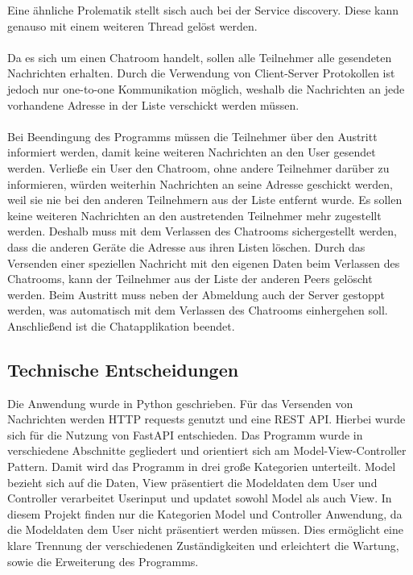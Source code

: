 Eine ähnliche Prolematik stellt sisch auch bei der Service discovery. Diese kann genauso mit einem weiteren Thread gelöst werden. 
\\
\\
Da es sich um einen Chatroom handelt, sollen alle Teilnehmer alle gesendeten Nachrichten erhalten.
Durch die Verwendung von Client-Server Protokollen ist jedoch nur one-to-one Kommunikation möglich, weshalb die Nachrichten an jede vorhandene Adresse in der Liste verschickt werden müssen\cite[S. 214]{steen23}.
\\
\\
Bei Beendingung des Programms müssen die Teilnehmer über den Austritt informiert werden, damit keine weiteren Nachrichten an den User gesendet werden.
Verließe ein User den Chatroom, ohne andere Teilnehmer darüber zu informieren, würden weiterhin Nachrichten an seine Adresse geschickt werden, weil sie nie bei den anderen Teilnehmern aus der Liste entfernt wurde.
Es sollen keine weiteren Nachrichten an den austretenden Teilnehmer mehr zugestellt werden.
Deshalb muss mit dem Verlassen des Chatrooms sichergestellt werden, dass die anderen Geräte die Adresse aus ihren Listen löschen.
Durch das Versenden einer speziellen Nachricht mit den eigenen Daten beim Verlassen des Chatrooms, kann der Teilnehmer aus der Liste der anderen Peers gelöscht werden. 
Beim Austritt muss neben der Abmeldung auch der Server gestoppt werden, was automatisch mit dem Verlassen des Chatrooms einhergehen soll. 
Anschließend ist die Chatapplikation beendet.
\subsection{Technische Entscheidungen}
Die Anwendung wurde in Python geschrieben. Für das Versenden von Nachrichten werden HTTP requests genutzt und eine REST API. Hierbei wurde sich für die Nutzung von FastAPI entschieden\cite{fastapi}. 
Das Programm wurde in verschiedene Abschnitte gegliedert und orientiert sich am Model-View-Controller Pattern. 
Damit wird das Programm in drei große Kategorien unterteilt. 
Model bezieht sich auf die Daten, View präsentiert die Modeldaten dem User und Controller verarbeitet Userinput und updatet sowohl Model als auch View.
In diesem Projekt finden nur die Kategorien Model und Controller Anwendung, da die Modeldaten dem User nicht präsentiert werden müssen.
Dies ermöglicht eine klare Trennung der verschiedenen Zuständigkeiten und erleichtert die Wartung, sowie die Erweiterung des Programms.
